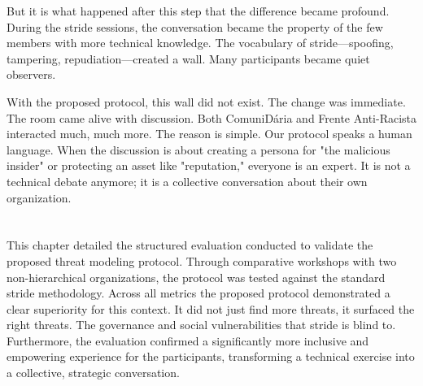 But it is what happened after this step that the difference became profound.
During the \gls{stride} sessions, the conversation became the property of the few
members with more technical knowledge. The vocabulary of \gls{stride}—spoofing,
tampering, repudiation—created a wall. Many participants became quiet observers.

With the proposed protocol, this wall did not exist. The change was immediate.
The room came alive with discussion. Both ComuniDária and Frente Anti-Racista
interacted much, much more. The reason is simple. Our protocol speaks a human
language. When the discussion is about creating a persona for "the malicious
insider" or protecting an asset like "reputation," everyone is an expert. It is
not a technical debate anymore; it is a collective conversation about their own
organization.

\section*{}
This chapter detailed the structured evaluation conducted to validate the
proposed threat modeling protocol. Through comparative workshops with two
non-hierarchical organizations, the protocol was tested against the
standard \gls{stride} methodology. Across all metrics the proposed protocol
demonstrated a clear superiority for this context. It did not
just find more threats, it surfaced the right
threats. The governance and social vulnerabilities that \gls{stride} is
blind to. Furthermore, the evaluation confirmed a significantly more inclusive
and empowering experience for the participants, transforming a technical
exercise into a collective, strategic conversation.